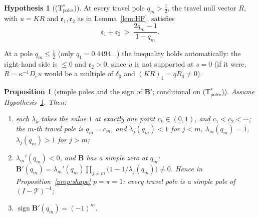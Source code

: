 \documentclass[11pt]{article}
\theoremstyle{plain}
\newtheorem{proposition}[theorem]{Proposition}
\theoremstyle{definition}
\newtheorem{hypothesis}[theorem]{Hypothesis}
\theoremstyle{remark}
\begin{document}
\begin{hypothesis}[\textup{(T$^\ast_{\mathrm{poles}}$)}]\label{hyp:Tstar}
At every travel pole $q_m>\tfrac12$, the travel null vector $R$, with $u=KR$ and
$\mathfrak e_1,\mathfrak e_2$ as in Lemma~\ref{lem:HF}, satisfies
\[
   \mathfrak e_1+\mathfrak e_2\ >\ \frac{2q_m-1}{1-q_m}.
\]
\end{hypothesis}

\noindent At a pole $q_m\le\tfrac12$ (only $q_1=0.4494\ldots$) the inequality holds automatically:
the right-hand side is $\le0$ and $\mathfrak e_2>0$, since $u$ is not supported at $s=0$ (if it were,
$R=\kappa^{-1}D_eu$ would be a multiple of $\delta_0$ and $(KR)_1=qR_0\ne0$).

\begin{proposition}[simple poles and the sign of $\mathbf B'$; conditional on
\textup{(T$^\ast_{\mathrm{poles}}$)}]\label{prop:simplepoles}
Assume Hypothesis~\ref{hyp:Tstar}. Then:
\begin{enumerate}[label=\textup{(\roman*)},leftmargin=2.2em,itemsep=0.1em,topsep=0.2em]
\item each $\lambda_k$ takes the value $1$ at exactly one point $c_k\in(0,1)$, and
$c_1<c_2<\cdots$; the $m$-th travel pole is $q_m=c_m$, and $\lambda_j(q_m)<1$ for $j<m$,
$\lambda_m(q_m)=1$, $\lambda_j(q_m)>1$ for $j>m$;
\item $\lambda_m'(q_m)<0$, and $\mathbf B$ has a simple zero at $q_m$:
$\mathbf B'(q_m)=\lambda_m'(q_m)\prod_{j\ne m}\bigl(1-1/\lambda_j(q_m)\bigr)\ne0$. Hence in
Proposition~\ref{prop:shape} $p=\pi=1$: every travel pole is a simple pole of $(I-\mathcal T)^{-1}$;
\item $\operatorname{sign}\mathbf B'(q_m)=(-1)^m$.
\end{enumerate}
\end{proposition}
\end{document}
